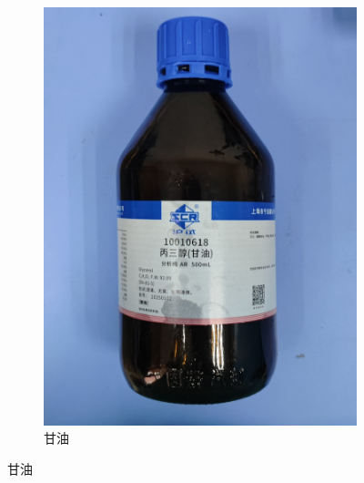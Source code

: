 \documentclass[a4paper]{report} %
\begin{document}
\begin{figure}[htbp]
\begin{subfigure}{0.22\textwidth}
        \includegraphics[width=\linewidth]{甘油.jpg}
        \caption{甘油}
    \end{subfigure}


\end{figure}
\end{document}
